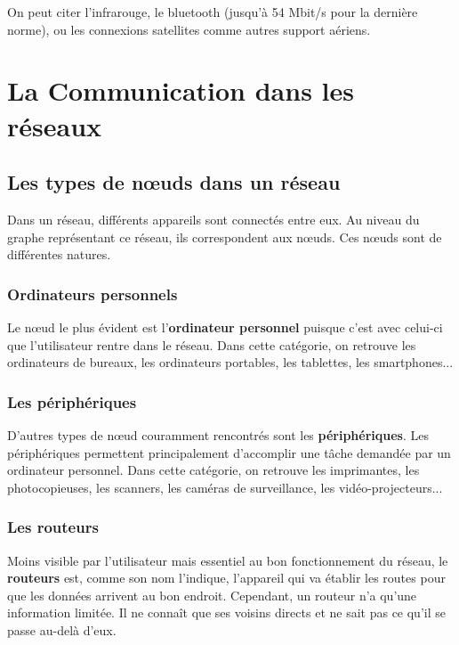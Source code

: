 \documentclass[11pt, a4paper]{book}
\begin{document}
On peut citer l'infrarouge, le bluetooth (jusqu'à 54 Mbit/s pour la dernière norme), ou les connexions satellites comme autres support aériens.






\section{La Communication dans les réseaux}


\subsection{Les types de nœuds dans un réseau}

Dans un réseau, différents appareils sont connectés entre eux. Au niveau du graphe représentant ce réseau, ils correspondent aux nœuds. Ces nœuds sont de différentes natures.

\subsubsection{Ordinateurs personnels}

Le nœud le plus évident est l'{\bf ordinateur personnel} puisque c'est avec celui-ci que l'utilisateur rentre dans le réseau. Dans cette catégorie, on retrouve les ordinateurs de bureaux, les ordinateurs portables, les tablettes, les smartphones...

\subsubsection{Les périphériques}

D'autres types de nœud couramment rencontrés sont les {\bf périphériques}. Les périphériques permettent principalement d'accomplir une tâche demandée par un ordinateur personnel. Dans cette catégorie, on retrouve les imprimantes, les photocopieuses, les scanners, les caméras de surveillance, les vidéo-projecteurs...

\subsubsection{Les routeurs}

Moins visible par l'utilisateur mais essentiel au bon fonctionnement du réseau, le {\bf routeurs} est, comme son nom l'indique, l'appareil qui va établir les routes pour que les données arrivent au bon endroit. Cependant, un routeur n'a qu'une information limitée. Il ne connaît que ses voisins directs et ne sait pas ce qu'il se passe au-delà d'eux. 
\end{document}
